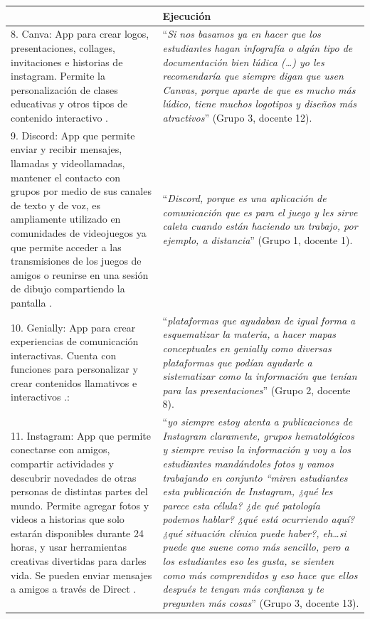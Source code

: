 \documentclass[spanish]{textolivre}
\begin{document}
\begin{longtable}{p{}p{}}
& Ejecución
\\
\midrule
8. Canva: App para crear logos, presentaciones, collages, invitaciones e historias de instagram. Permite la personalización de clases educativas y otros tipos de contenido interactivo \cite{canva2021}. &
“\emph{Si nos basamos ya en hacer que los estudiantes hagan infografía o algún tipo de documentación bien lúdica (…) yo les recomendaría que siempre digan que usen Canvas, porque aparte de que es mucho más lúdico, tiene muchos logotipos y diseños más atractivos}” (Grupo 3, docente 12).
\\
9. Discord: App que permite enviar y recibir mensajes, llamadas y videollamadas, mantener el contacto con grupos por medio de sus canales de texto y de voz, es ampliamente utilizado en comunidades de videojuegos ya que permite acceder a las transmisiones de los juegos de amigos o reunirse en una sesión de dibujo compartiendo la pantalla \cite{discordinc2021}. &
“\emph{Discord, porque es una aplicación de comunicación  que es para el juego y les sirve caleta cuando están haciendo un trabajo, por ejemplo, a distancia}” (Grupo 1, docente 1).
\\
10. Genially: App para crear experiencias de comunicación interactivas. Cuenta con funciones para personalizar y crear contenidos llamativos e interactivos \cite{genially_genially_2021}.: &
“\emph{plataformas que ayudaban de igual forma a esquematizar la materia, a hacer mapas conceptuales en genially como diversas plataformas que podían ayudarle a sistematizar como la información que tenían para las presentaciones}” (Grupo 2, docente 8).
\\
11. Instagram: App que permite conectarse con amigos, compartir actividades y descubrir novedades de otras personas de distintas partes del mundo. Permite agregar fotos y videos a historias que solo estarán disponibles durante 24 horas, y usar herramientas creativas divertidas para darles vida. Se pueden enviar mensajes a amigos a través de Direct \cite{instagram_instagram_2021}. &
“\emph{yo siempre estoy atenta a publicaciones de Instagram claramente, grupos hematológicos y siempre reviso la información y voy a los estudiantes mandándoles fotos y vamos trabajando en conjunto “miren estudiantes esta publicación de Instagram, ¿qué les parece esta célula? ¿de qué patología podemos hablar? ¿qué está ocurriendo aquí? ¿qué situación clínica puede haber?, eh…si puede que suene como más sencillo, pero a los estudiantes eso les gusta, se sienten como más comprendidos y eso hace que ellos después te tengan más confianza y te pregunten más cosas}” (Grupo 3, docente 13).

\end{longtable}
\end{document}
